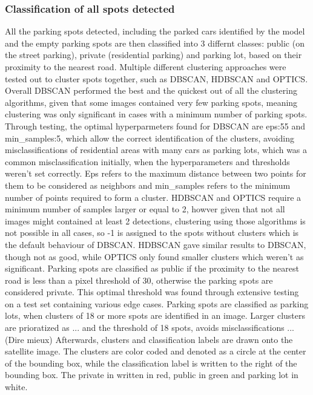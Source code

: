 \subsubsection{Classification of all spots detected}
All the parking spots detected, including the parked cars identified by the model and the empty parking spots are then classified into 3 differnt classes: public (on the street parking), private (residential parking) and parking lot, based on their proximity to the nearest road.
Multiple different clustering approaches were tested out to cluster spots together, such as DBSCAN, HDBSCAN and OPTICS.
Overall DBSCAN performed the best and the quickest out of all the clustering algorithms, given that some images contained very few parking spots, meaning clustering was only significant in cases with a minimum number of parking spots. 
Through testing, the optimal hyperparmeters found for DBSCAN are eps:55 and min_samples:5, which allow the correct identification of the clusters, avoiding misclassifications of residential areas with many cars as parking lots, which was a common misclassification initially, when the hyperparameters and thresholds weren't set correctly.
Eps refers to the maximum distance between two points for them to be considered as neighbors and min_samples refers to the minimum number of points required to form a cluster.
HDBSCAN and OPTICS require a minimum number of samples larger or equal to 2, howver given that not all images might contained at least 2 detections, clustering using those algorithms is not possible in all cases, so -1 is assigned to the spots without clusters which is the default behaviour of DBSCAN.
HDBSCAN gave similar results to DBSCAN, though not as good, while OPTICS only found smaller clusters which weren't as significant.
Parking spots are classified as public if the proximity to the nearest road is less than a pixel threshold of 30, otherwise the parking spots are considered private. This optimal threshold was found through extensive testing on a test set containing various edge cases.
Parking spots are classified as parking lots, when clusters of 18 or more spots are identified in an image. Larger clusters are prioratized as ... and the threshold of 18 spots, avoids misclassifications ... (Dire mieux)
Afterwards, clusters and classification labels are drawn onto the satellite image. The clusters are color coded and denoted as a circle at the center of the bounding box, while the classification label is written to the right of the bounding box. The private in written in red, public in green and parking lot in white.


